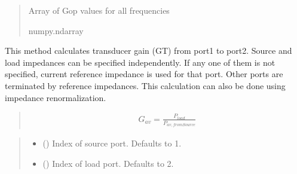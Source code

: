 \documentclass[letterpaper,10pt,english]{sphinxmanual}
\begin{document}
\begin{fulllineitems}
\begin{fulllineitems}
\begin{quote}
\begin{description}
\begin{itemize}
\end{itemize}

\sphinxAtStartPar
Array of Gop values for all frequencies

\sphinxAtStartPar
numpy.ndarray

\end{description}\end{quote}

\end{fulllineitems}


\begin{fulllineitems}
\label{\detokenize{touchstone:touchstone.spfile.gt}}
\pysigstartsignatures
{}
\pysigstopsignatures
\sphinxAtStartPar
This method calculates transducer gain (GT) from port1 to port2. Source and load impedances can be specified independently. If any one of them is not specified, current reference impedance is used for that port. Other ports are terminated by reference impedances. This calculation can also be done using impedance renormalization.
\begin{quote}
\begin{equation*}
\begin{split}G_{av}=\frac{P_{load}}{P_{av,fromSource}}\end{split}
\end{equation*}\end{quote}
\begin{quote}\begin{description}
\begin{itemize}
\item {} 
\sphinxAtStartPar
{} (\sphinxstyleliteralemphasis{\sphinxupquote{, }}) \textendash{} Index of source port. Defaults to 1.

\item {} 
\sphinxAtStartPar
{} (\sphinxstyleliteralemphasis{\sphinxupquote{, }}) \textendash{} Index of load port. Defaults to 2.


\end{itemize}
\end{description}
\end{quote}
\end{fulllineitems}
\end{fulllineitems}
\end{document}
